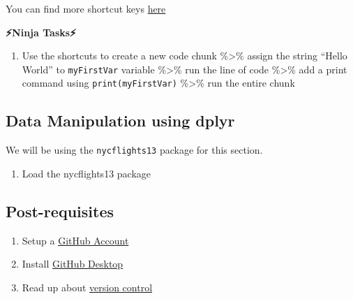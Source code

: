 \documentclass[]{article}
\providecommand{\tightlist}{%
  \setlength{\itemsep}{0pt}\setlength{\parskip}{0pt}}
\begin{document}
You can find more shortcut keys
\href{https://support.rstudio.com/hc/en-us/articles/200711853-Keyboard-Shortcuts}{here}

\textbf{⚡Ninja Tasks⚡}

\begin{enumerate}
\def\labelenumi{\arabic{enumi}.}
\tightlist
\item
  Use the shortcuts to create a new code chunk \%\textgreater{}\% assign
  the string ``Hello World'' to \texttt{myFirstVar} variable
  \%\textgreater{}\% run the line of code \%\textgreater{}\% add a print
  command using \texttt{print(myFirstVar)} \%\textgreater{}\% run the
  entire chunk
\end{enumerate}

\subsection{Data Manipulation using
dplyr}\label{data-manipulation-using-dplyr}

We will be using the \texttt{nycflights13} package for this section.

\begin{enumerate}
\def\labelenumi{\arabic{enumi}.}
\setcounter{enumi}{1}
\tightlist
\item
  Load the nycflights13 package
\end{enumerate}

\subsection{Post-requisites}\label{post-requisites}

\begin{enumerate}
\def\labelenumi{\arabic{enumi}.}
\tightlist
\item
  Setup a \href{https://github.com}{GitHub Account}
\item
  Install \href{https://desktop.github.com/}{GitHub Desktop}
\item
  Read up about
  \href{https://www.atlassian.com/git/tutorials/what-is-version-control}{version
  control}
\end{enumerate}
\end{document}
